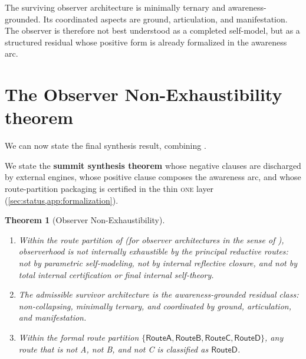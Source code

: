 \documentclass[11pt]{article}
\theoremstyle{plain}
\newtheorem{theorem}{Theorem}[section]
\theoremstyle{definition}
\theoremstyle{remark}
\newcommand{\ONE}{\textsc{one}}
\newcommand{\RouteA}{\mathsf{RouteA}}
\newcommand{\RouteB}{\mathsf{RouteB}}
\newcommand{\RouteC}{\mathsf{RouteC}}
\newcommand{\RouteD}{\mathsf{RouteD}}
\begin{document}
\begin{keybox}[title={Final positive synthesis}]
The surviving observer architecture is minimally ternary and
awareness-grounded.  Its coordinated aspects are ground, articulation,
and manifestation.  The observer is therefore not best understood as a
completed self-model, but as a structured residual whose positive form is
already formalized in the awareness arc.
\end{keybox}

\section{The Observer Non-Exhaustibility theorem}
\label{sec:summit}

We can now state the final synthesis result, combining
.

We state the \textbf{summit synthesis theorem} whose negative clauses are
discharged by external engines, whose positive clause composes the
awareness arc, and whose route-partition packaging is certified in the thin
\ONE{} layer (\cref{sec:status,app:formalization}).

\begin{theorem}[Observer Non-Exhaustibility]
\label{thm:summit}
\hfill
\begin{enumerate}[label=(\roman*),leftmargin=2.2em]
\item Within the route partition of  (for observer
      architectures in the sense of ), observerhood is not
      internally exhaustible by the principal reductive routes: not by
      parametric self-modeling, not by internal reflective closure, and
      not by total internal certification or final internal self-theory.
\item The admissible survivor architecture is the awareness-grounded
      residual class: non-collapsing, minimally ternary, and coordinated
      by ground, articulation, and manifestation.
\item Within the formal route partition
      $\{\RouteA,\RouteB,\RouteC,\RouteD\}$, any route that is not A,
      not B, and not C is classified as $\RouteD$.
\end{enumerate}
\end{theorem}
\end{document}
